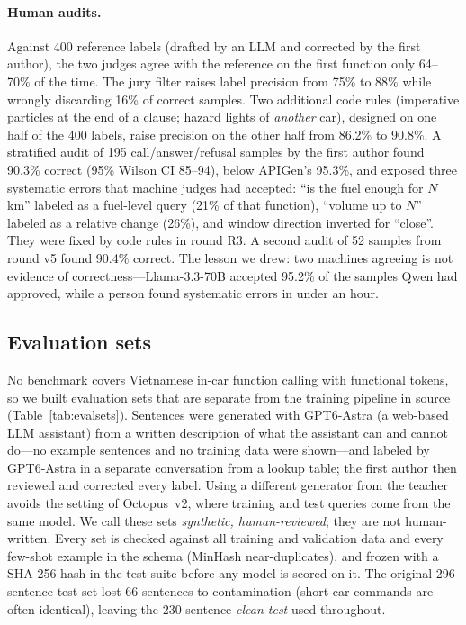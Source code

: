 \paragraph{Human audits.}
Against 400 reference labels (drafted by an LLM and corrected by the first author), the two judges agree with the reference on
the first function only 64--70\% of the time. The jury filter raises label precision from 75\% to 88\% while wrongly
discarding 16\% of correct samples. Two additional code rules (imperative particles at the end of a clause; hazard lights of
\emph{another} car), designed on one half of the 400 labels, raise precision on the other half from 86.2\% to 90.8\%. A stratified audit of 195 call/answer/refusal samples by the first author found 90.3\% correct (95\% Wilson CI 85--94),
below APIGen's 95.3\%, and exposed three systematic errors that machine judges had accepted: ``is the fuel enough for
$N$\,km'' labeled as a fuel-level query (21\% of that function), ``volume up to $N$'' labeled as a relative change (26\%), and
window direction inverted for ``close''. They were fixed by code rules in round R3. A second audit of 52 samples from round
v5 found 90.4\% correct. The lesson we drew: two machines agreeing is not evidence of correctness---Llama-3.3-70B accepted
95.2\% of the samples Qwen had approved, while a person found systematic errors in under an hour.

\subsection{Evaluation sets}
\label{sec:evalsets}

No benchmark covers Vietnamese in-car function calling with functional tokens, so we built evaluation sets that are separate
from the training pipeline in source (Table~\ref{tab:evalsets}). Sentences were generated with GPT6-Astra (a web-based LLM assistant) from a written description
of what the assistant can and cannot do---no example sentences and no training data were shown---and labeled by GPT6-Astra in a
separate conversation from a lookup table; the first author then reviewed and corrected every label. Using a different
generator from the teacher avoids the setting of Octopus~v2, where training and test queries come from the same model. We
call these sets \emph{synthetic, human-reviewed}; they are not human-written. Every set is checked against all training and
validation data and every few-shot example in the schema (MinHash near-duplicates), and frozen with a SHA-256 hash in the test
suite before any model is scored on it. The original 296-sentence test set lost 66 sentences to contamination (short car
commands are often identical), leaving the 230-sentence \emph{clean test} used throughout.

